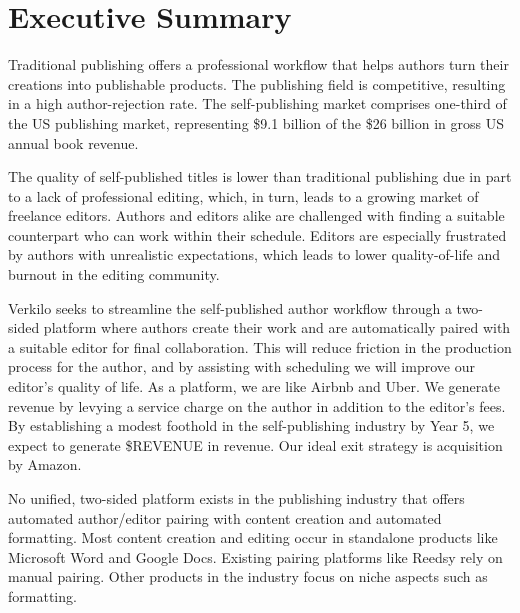 \documentclass[10pt,openany]{book}
\begin{document}
      \listoftables
  
      \listoffigures
  
\newpage %

\pagestyle{fancy}
\hypertarget{executive-summary}{%
\chapter{Executive Summary}\label{executive-summary}}

Traditional publishing offers a professional workflow that helps authors
turn their creations into publishable products. The publishing field is
competitive, resulting in a high author-rejection rate. The
self-publishing market comprises one-third of the US publishing market,
representing \$9.1 billion of the \$26 billion in gross US annual book
revenue.

The quality of self-published titles is lower than traditional
publishing due in part to a lack of professional editing, which, in
turn, leads to a growing market of freelance editors. Authors and
editors alike are challenged with finding a suitable counterpart who can
work within their schedule. Editors are especially frustrated by authors
with unrealistic expectations, which leads to lower quality-of-life and
burnout in the editing community.

Verkilo seeks to streamline the self-published author workflow through a
two-sided platform where authors create their work and are automatically
paired with a suitable editor for final collaboration. This will reduce
friction in the production process for the author, and by assisting with
scheduling we will improve our editor's quality of life. As a platform,
we are like Airbnb and Uber. We generate revenue by levying a service
charge on the author in addition to the editor's fees. By establishing a
modest foothold in the self-publishing industry by Year 5, we expect to
generate \$REVENUE in revenue. Our ideal exit strategy is acquisition by
Amazon.

No unified, two-sided platform exists in the publishing industry that
offers automated author/editor pairing with content creation and
automated formatting. Most content creation and editing occur in
standalone products like Microsoft Word and Google Docs. Existing
pairing platforms like Reedsy rely on manual pairing. Other products in
the industry focus on niche aspects such as formatting.
\end{document}

